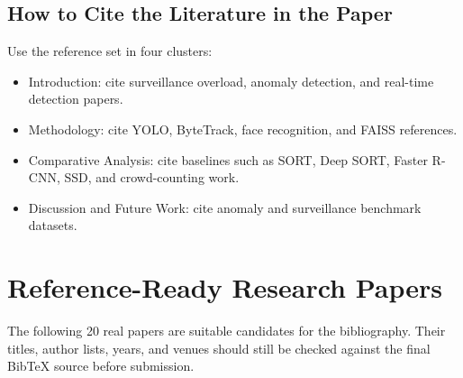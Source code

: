 \documentclass[11pt]{article}
\begin{document}
\subsection{How to Cite the Literature in the Paper}
Use the reference set in four clusters:

\begin{itemize}
\item Introduction: cite surveillance overload, anomaly detection, and real-time detection papers.
\item Methodology: cite YOLO, ByteTrack, face recognition, and FAISS references.
\item Comparative Analysis: cite baselines such as SORT, Deep SORT, Faster R-CNN, SSD, and crowd-counting work.
\item Discussion and Future Work: cite anomaly and surveillance benchmark datasets.
\end{itemize}

\section{Reference-Ready Research Papers}

The following 20 real papers are suitable candidates for the bibliography. Their titles, author lists, years, and venues should still be checked against the final BibTeX source before submission.
\end{document}
